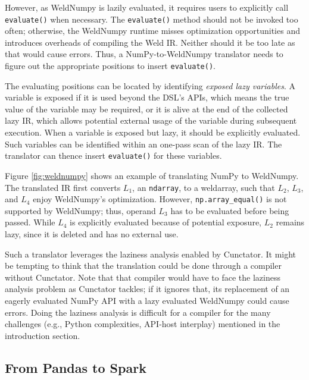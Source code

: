\documentclass[sigconf]{acmart}\settopmatter{printfolios=true,printccs=false,printacmref=false}\setcopyright{none}
\begin{document}
However, as WeldNumpy is lazily evaluated, it requires users to explicitly call \texttt{evaluate()} when necessary. The \texttt{evaluate()} method should not be invoked too often; otherwise, the WeldNumpy runtime misses optimization opportunities and introduces overheads of compiling the Weld IR. Neither should it be too late as that would cause errors. Thus, a NumPy-to-WeldNumpy translator needs to figure out the appropriate positions to insert \texttt{evaluate()}.

The evaluating positions can be located by identifying \textit{exposed lazy variables}. A variable is exposed if it is used beyond the DSL's APIs, which means the true value of the variable may be required, or it is alive at the end of the collected lazy IR, which allows potential external usage of the variable during subsequent execution. When a variable is exposed but lazy, it should be explicitly evaluated. Such variables can be identified within an one-pass scan of the lazy IR. The translator can thence insert \texttt{evaluate()} for these variables.

Figure \ref{fig:weldnumpy} shows an example of translating NumPy to WeldNumpy. The translated IR first converts $L_1$, an \texttt{ndarray}, to a weldarray, such that $L_2$, $L_3$, and $L_4$ enjoy WeldNumpy's optimization. However, \texttt{np.array\_equal()} is not supported by WeldNumpy; thus, operand $L_3$ has to be evaluated before being passed. While $L_4$ is explicitly evaluated because of potential exposure, $L_2$ remains lazy, since it is deleted and has no external use.

Such a translator leverages the laziness analysis enabled by Cunctator. It might be tempting to think that the translation could be done through a compiler without Cunctator. Note that that compiler would have to face the laziness analysis problem as Cunctator tackles; if it ignores that, its replacement of an eagerly evaluated NumPy API with a lazy evaluated WeldNumpy could cause errors. Doing the laziness analysis is difficult for a compiler for the many challenges (e.g., Python complexities, API-host interplay) mentioned in the introduction section. 

\subsection{From Pandas to Spark}
\label{sec:pandas2spark}

\end{document}
